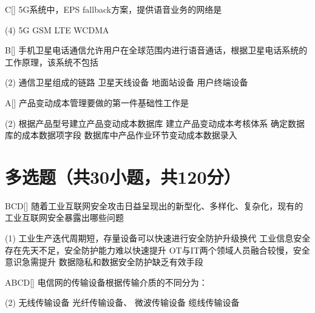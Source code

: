 \begin{choice}{C}[]
    5G系统中，EPS fallback方案，提供语音业务的网络是
    \begin{tasks}(4)
        \task 5G
        \task GSM
        \task LTE
        \task WCDMA
    \end{tasks}
\end{choice}


\begin{choice}{B}[]
    手机卫星电话通信允许用户在全球范围内进行语音通话，根据卫星电话系统的工作原理，该系统不包括
    \begin{tasks}(2)
        \task 通信卫星组成的链路
        \task 卫星天线设备
        \task 地面站设备
        \task 用户终端设备
    \end{tasks}
\end{choice}


\begin{choice}{A}[]
    产品变动成本管理要做的第一件基础性工作是
    \begin{tasks}(2)
        \task 根据产品型号建立产品变动成本数据库
        \task 建立产品变动成本考核体系
        \task 确定数据库的成本数据项字段
        \task 数据库中产品作业环节变动成本数据录入
    \end{tasks}
\end{choice}



\section{多选题（共30小题，共120分）}
\begin{choice}{\;BCD\;}[]
    随着工业互联网安全攻击日益呈现出的新型化、多样化、复杂化，现有的工业互联网安全暴露出哪些问题
    \begin{tasks}(1)
        \task 工业生产迭代周期短，存量设备可以快速进行安全防护升级换代
        \task 工业信息安全存在先天不足，安全防护能力难以快速提升
        \task OT与IT两个领域人员融合较慢，安全意识急需提升
        \task 数据隐私和数据安全防护缺乏有效手段
    \end{tasks}
\end{choice}

\begin{choice}{\;ABCD\;}[]
    电信网的传输设备根据传输介质的不同分为：
    \begin{tasks}(2)
        \task 无线传输设备
        \task 光纤传输设备、
        \task 微波传输设备
        \task 缆线传输设备
    \end{tasks}
\end{choice}

